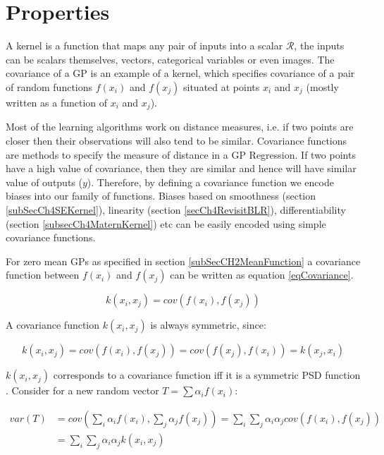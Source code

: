 \section{Properties}\label{secPropertiesOfCovariance}
A kernel is a function that maps any pair of inputs into a scalar \(\mathcal{R}\), the inputs can be scalars themselves, vectors, categorical variables or even images. The covariance of a GP is an example of a kernel, which specifies covariance of a pair of random functions \(f(x_{i})\) and \(f(x_{j})\) situated at points \(x_{i}\) and \(x_{j}\) (mostly written as a function of \(x_{i}\) and \(x_{j}\)). 

Most of the learning algorithms work on distance measures, i.e. if two points are closer then their observations will also tend to be similar. Covariance functions are methods to specify the measure of distance in a GP Regression. If two points have a high value of covariance, then they are similar and hence will have similar value of outputs (\(y\)). Therefore, by defining a covariance function we encode biases into our family of functions. Biases based on smoothness (section \ref{subSecCh4SEKernel}), linearity (section \ref{secCh4RevisitBLR}), differentiability (section \ref{subsecCh4MaternKernel}) etc can be easily encoded using simple covariance functions.

For zero mean GPs as specified in section \ref{subSecCH2MeanFunction} a covariance function between \(f(x_{i})\) and \(f(x_{j})\) can be written as equation \ref{eqCovariance}.

\begin{equation}\label{eqCovariance}
    k(x_{i}, x_{j}) = cov(f(x_{i}), f(x_{j}))
\end{equation}

A covariance function \(k(x_{i}, x_{j})\) is always symmetric, since: 

\begin{equation}\label{eqSymmetricCovariance}
    k(x_{i}, x_{j}) = cov(f(x_{i}), f(x_{j})) = cov(f(x_{j}), f(x_{i})) =  k(x_{j}, x_{i})
\end{equation}

\(k(x_{i}, x_{j})\) corresponds to a covariance function iff it is a symmetric PSD function \cite{loeve1978probability, durrande2001etude}. Consider for a new random vector \(T = \sum \alpha_{i}f(x_{i})\):

\begin{equation}\label{eqDerivePSDCovariance}
    \begin{aligned}
        var(T) & = cov\left ( \sum_{i} \alpha_{i}f(x_{i}), \sum_{j} \alpha_{j}f(x_{j}) \right ) = \sum_{i}\sum_{j}\alpha_{i}\alpha_{j}cov(f(x_{i}), f(x_{j})) \\
& = \sum_{i}\sum_{j}\alpha_{i}\alpha_{j}k(x_{i}, x_{j})
    \end{aligned}
\end{equation}

